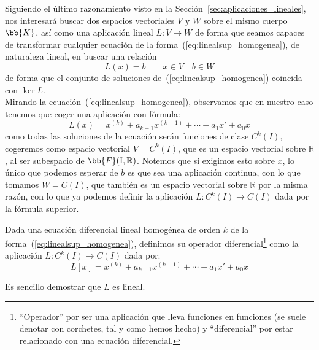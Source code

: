 Siguiendo el último razonamiento visto en la Sección~\ref{sec:aplicaciones_lineales}, nos interesará buscar dos espacios vectoriales $V$ y $W$ sobre el mismo cuerpo $\bb{K}$, así como una aplicación lineal $L:V\rightarrow W$ de forma que seamos capaces de transformar cualquier ecuación de la forma~(\ref{eq:linealsup_homogenea}), de naturaleza lineal, en buscar una relación
\begin{equation*}
    L(x) = b \qquad x\in V \quad b\in W
\end{equation*}
de forma que el conjunto de soluciones de~(\ref{eq:linealsup_homogenea}) coincida con $\ker L$.\\

Mirando la ecuación~(\ref{eq:linealsup_homogenea}), observamos que en nuestro caso tenemos que coger una aplicación con fórmula:
\begin{equation*}
    L(x) = x^{(k)} + a_{k-1} x^{(k-1)} + \cdots + a_1x' + a_0 x 
\end{equation*}
como todas las soluciones de la ecuación serán funciones de clase $C^k(I)$, cogeremos como espacio vectorial $V=C^k(I)$, que es un espacio vectorial sobre $\mathbb{R}$, al ser subespacio de $\bb{F}(\text{I},\mathbb{R})$. Notemos que si exigimos esto sobre $x$, lo único que podemos esperar de $b$ es que sea una aplicación continua, con lo que tomamos $W = C(I)$, que también es un espacio vectorial sobre $\mathbb{R}$ por la misma razón, con lo que ya podemos definir la aplicación $L:C^k(I)\rightarrow C(I)$ dada por la fórmula superior.

\begin{definicion}
    Dada una ecuación diferencial lineal homogénea de orden $k$ de la forma~(\ref{eq:linealsup_homogenea}), definimos su operador diferencial\footnote{``Operador'' por ser una aplicación que lleva funciones en funciones (se suele denotar con corchetes, tal y como hemos hecho) y ``diferencial'' por estar relacionado con una ecuación diferencial.} como la aplicación $L:C^k(I)\rightarrow C(I)$ dada por:
    \begin{equation*}
        L[x] = x^{(k)} + a_{k-1}x^{(k-1)} + \cdots + a_1x' + a_0x
    \end{equation*}
\end{definicion}
Es sencillo demostrar que $L$ es lineal.

